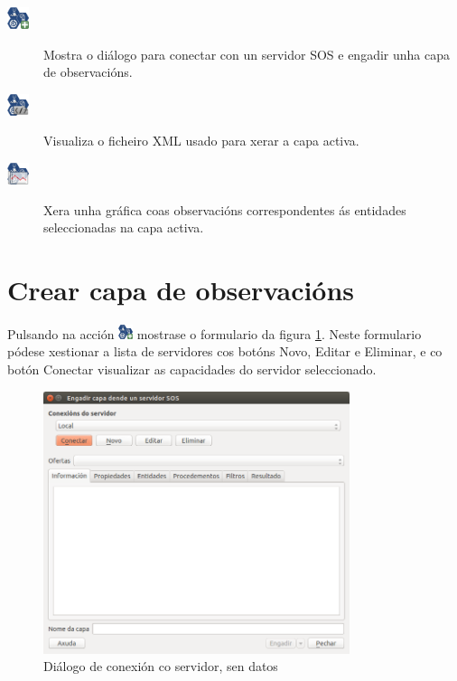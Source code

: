 \begin{description}
\item [{\includegraphics[width=24px]{images/manual/icon_add.png}}] Mostra o diálogo para conectar con un servidor SOS e engadir unha capa de observacións. 
\item [{\includegraphics[width=24px]{images/manual/icon_xml.png}}] Visualiza o ficheiro XML usado para xerar a capa activa. 
\item [{\includegraphics[width=24px]{images/manual/icon_plot.png}}] Xera unha gráfica coas observacións correspondentes ás entidades seleccionadas na capa activa.
\end{description}

\section{Crear capa de observacións}
Pulsando na acción \includegraphics[width=16px]{images/manual/icon_add.png} mostrase o formulario da figura \ref{fig:tabInfo-limpia}. Neste formulario pódese xestionar a lista de servidores cos botóns Novo, Editar e Eliminar, e co botón Conectar visualizar as capacidades do servidor seleccionado.
\begin{figure}[hbtp]
\centering
\includegraphics[width=0.8\textwidth]{images/manual/tabInfo-limpia.png}
\caption{Diálogo de conexión co servidor, sen datos}
\label{fig:tabInfo-limpia}
\end{figure}

